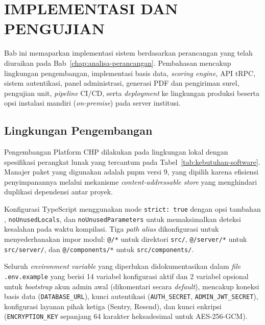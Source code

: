 \chapter{IMPLEMENTASI DAN PENGUJIAN}
\label{chap:implementasi}

Bab ini memaparkan implementasi sistem berdasarkan perancangan yang telah diuraikan pada Bab~\ref{chap:analisa-perancangan}. Pembahasan mencakup lingkungan pengembangan, implementasi basis data, \textit{scoring engine}, API tRPC, sistem autentikasi, panel administrasi, generasi PDF dan pengiriman surel, pengujian unit, \textit{pipeline} CI/CD, serta \textit{deployment} ke lingkungan produksi beserta opsi instalasi mandiri (\textit{on-premise}) pada server institusi.

\section{Lingkungan Pengembangan}
\label{sec:lingkungan-dev}

Pengembangan Platform CHP dilakukan pada lingkungan lokal dengan spesifikasi perangkat lunak yang tercantum pada Tabel~\ref{tab:kebutuhan-software}. Manajer paket yang digunakan adalah pnpm versi 9, yang dipilih karena efisiensi penyimpanannya melalui mekanisme \textit{content-addressable store} yang menghindari duplikasi dependensi antar proyek.

Konfigurasi TypeScript menggunakan mode \texttt{strict: true} dengan opsi tambahan \texttt{}, \texttt{noUnusedLocals}, dan \texttt{noUnusedParameters} untuk memaksimalkan deteksi kesalahan pada waktu kompilasi. Tiga \textit{path alias} dikonfigurasi untuk menyederhanakan impor modul: \texttt{@/*} untuk direktori \texttt{src/}, \texttt{@/server/*} untuk \texttt{src/server/}, dan \texttt{@/components/*} untuk \texttt{src/components/}.

Seluruh \textit{environment variable} yang diperlukan didokumentasikan dalam \textit{file} \texttt{.env.example} yang berisi 14 variabel konfigurasi aktif dan 2 variabel opsional untuk \textit{bootstrap} akun admin awal (dikomentari secara \textit{default}), mencakup koneksi basis data (\texttt{DATABASE\_URL}), kunci autentikasi (\texttt{AUTH\_SECRET}, \texttt{ADMIN\_JWT\_SECRET}), konfigurasi layanan pihak ketiga (Sentry, Resend), dan kunci enkripsi (\texttt{ENCRYPTION\_KEY} sepanjang 64 karakter heksadesimal untuk AES-256-GCM).

